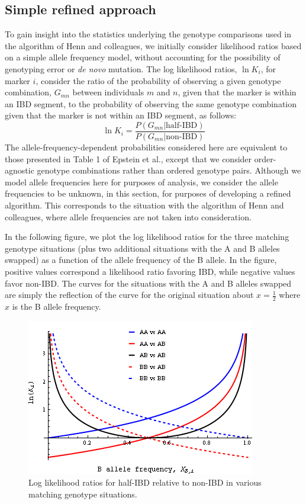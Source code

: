 \documentclass{article}
\begin{document}
\subsection{Simple refined approach}
To gain insight into the statistics underlying the genotype comparisons used in the algorithm of Henn and colleagues, we initially consider likelihood ratios based on a simple allele frequency model, without accounting for the possibility of genotyping error or \textit{de novo} mutation. The log likelihood ratios, $\ln K_i$, for marker $i$, consider the ratio of the probability of observing a given genotype combination, $G_{mn}$ between individuals $m$ and $n$, given that the marker is within an IBD segment, to the probability of observing the same genotype combination given that the marker is not within an IBD segment, as follows:
\begin{equation}
  \ln K_i = \frac{P(G_{mn} | \text{half-IBD})}{P(G_{mn} | \text{non-IBD})}
\end{equation}
The allele-frequency-dependent probabilities considered here are equivalent to those presented in Table 1 of Epstein et al.,\citep{RELPAIR} except that we consider order-agnostic genotype combinations rather than ordered genotype pairs. Although we model allele frequencies here for purposes of analysis, we consider the allele frequencies to be unknown, in this section, for purposes of developing a refined algorithm. This corresponds to the situation with the algorithm of Henn and colleagues, where allele frequencies are not taken into consideration.

In the following figure, we plot the log likelihood ratios for the three matching genotype situations (plus two additional situations with the A and B alleles swapped) as a function of the allele frequency of the B allele. In the figure, positive values correspond a likelihood ratio favoring IBD, while negative values favor non-IBD. The curves for the situations with the A and B alleles swapped are simply the reflection of the curve for the original situation about $x=\frac{1}{2}$ where $x$ is the B allele frequency.

\begin{figure}[h!]
\noindent
\centering
\includegraphics[scale=0.8]{llrs_rev2}
\caption{Log likelihood ratios for half-IBD relative to non-IBD in various matching genotype situations.}
\label{fig:llrs}
\end{figure}
\end{document}
